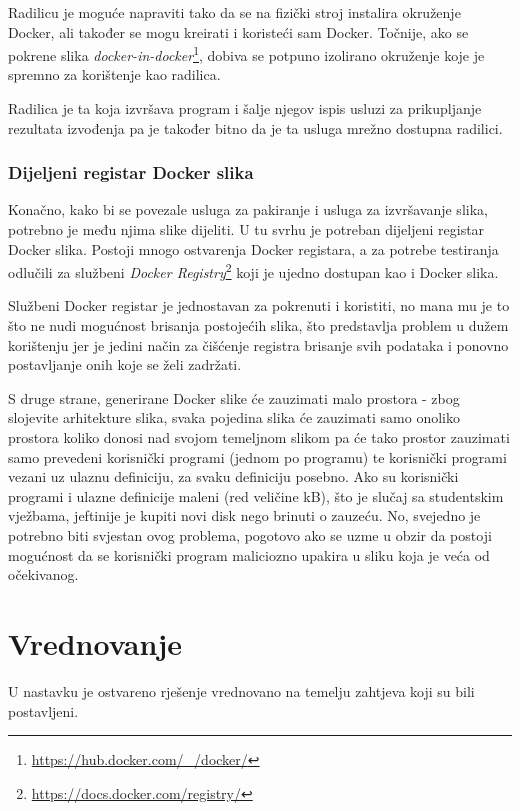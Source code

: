\documentclass[times, utf8, zavrsni]{fer}
\begin{document}
{Radilicu je moguće napraviti tako da se na fizički stroj instalira okruženje Docker, ali također se mogu kreirati i koristeći sam Docker. Točnije, ako se pokrene slika {\textit{docker-in-docker}}{\footnote{\url{https://hub.docker.com/_/docker/}}}, dobiva se potpuno izolirano okruženje koje je spremno za korištenje kao radilica.

Radilica je ta koja izvršava program i šalje njegov ispis usluzi za prikupljanje rezultata izvođenja pa je također bitno da je ta usluga mrežno dostupna radilici.

\subsection{Dijeljeni registar Docker slika}
\label{sec:dockerregistry}

Konačno, kako bi se povezale usluga za pakiranje i usluga za izvršavanje slika, potrebno je među njima slike dijeliti. U tu svrhu je potreban dijeljeni registar Docker slika. Postoji mnogo ostvarenja Docker registara, a za potrebe testiranja odlučili za službeni {\textit{Docker Registry}}{\footnote{\url{https://docs.docker.com/registry/}}} koji je ujedno dostupan kao i Docker slika.

Službeni Docker registar je jednostavan za pokrenuti i koristiti, no mana mu je to što ne nudi mogućnost brisanja postojećih slika, što predstavlja problem u dužem korištenju jer je jedini način za čišćenje registra brisanje svih podataka i ponovno postavljanje onih koje se želi zadržati.

S druge strane, generirane Docker slike će zauzimati malo prostora - zbog slojevite arhitekture slika, svaka pojedina slika će zauzimati samo onoliko prostora koliko donosi nad svojom temeljnom slikom pa će tako prostor zauzimati samo prevedeni korisnički programi (jednom po programu) te korisnički programi vezani uz ulaznu definiciju, za svaku definiciju posebno. Ako su korisnički programi i ulazne definicije maleni (red veličine kB), što je slučaj sa studentskim vježbama, jeftinije je kupiti novi disk nego brinuti o zauzeću. No, svejedno je potrebno biti svjestan ovog problema, pogotovo ako se uzme u obzir da postoji mogućnost da se korisnički program maliciozno upakira u sliku koja je veća od očekivanog.

\chapter{Vrednovanje}

U nastavku je ostvareno rješenje vrednovano na temelju zahtjeva koji su bili postavljeni.

}
\end{document}
